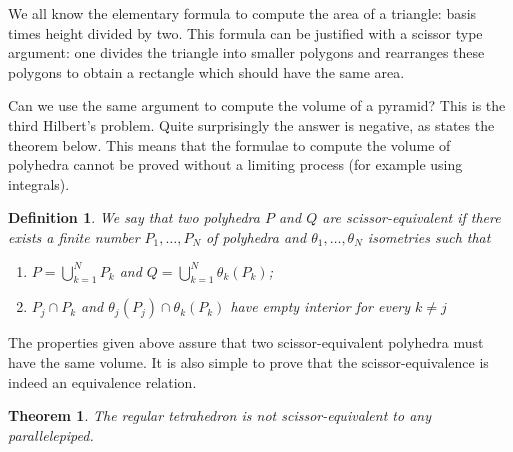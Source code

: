 \documentclass[12pt]{article}
\newtheorem{theorem}{Theorem}
\newtheorem{definition}{Definition}
\theoremstyle{remark}
\begin{document}
We all know the elementary formula to compute the area of a triangle: basis times height divided by two. This formula can be justified with a scissor type argument: 
one divides the triangle into smaller polygons and rearranges these polygons to obtain a rectangle which should have the same area.

Can we use the same argument to compute the volume of a pyramid? This is 
the third Hilbert's problem. Quite surprisingly the answer is negative, as states the theorem below. This means that the formulae to compute the volume of polyhedra cannot be proved without a limiting process (for example using integrals).

\begin{definition}
We say that two polyhedra $P$ and $Q$ are \emph{scissor-equivalent} if there exists a finite number $P_1,\ldots, P_N$ of polyhedra and $\theta_1,\ldots,\theta_N$ isometries such that 
\begin{enumerate}
\item $P=\bigcup_{k=1}^N P_k$ and $Q=\bigcup_{k=1}^N \theta_k(P_k)$;
\item $P_j\cap P_k$ and $\theta_j(P_j) \cap \theta_k(P_k)$ have empty interior
for every $k\neq j$
\end{enumerate}
\end{definition}

The properties given above assure that two scissor-equivalent polyhedra 
must have the same volume. It is also simple to prove that the scissor-equivalence is indeed an equivalence relation.

\begin{theorem}
The regular tetrahedron is not \emph{scissor-equivalent} to any parallelepiped.
\end{theorem}
\end{document}
